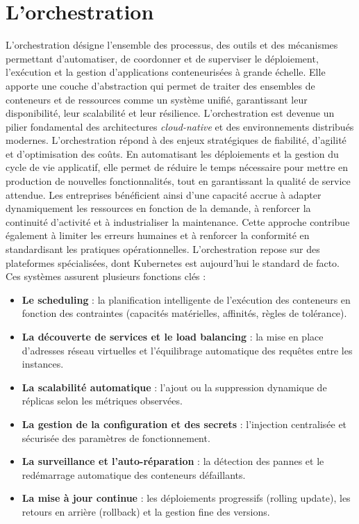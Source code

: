 \section{L’orchestration}

L’orchestration désigne l’ensemble des processus, des outils et des mécanismes permettant d’automatiser, de coordonner et de superviser le déploiement, l’exécution et la gestion d’applications conteneurisées à grande échelle. Elle apporte une couche d’abstraction qui permet de traiter des ensembles de conteneurs et de ressources comme un système unifié, garantissant leur disponibilité, leur scalabilité et leur résilience. L’orchestration est devenue un pilier fondamental des architectures \textit{cloud-native} et des environnements distribués modernes.
L’orchestration répond à des enjeux stratégiques de fiabilité, d’agilité et d’optimisation des coûts. En automatisant les déploiements et la gestion du cycle de vie applicatif, elle permet de réduire le temps nécessaire pour mettre en production de nouvelles fonctionnalités, tout en garantissant la qualité de service attendue. Les entreprises bénéficient ainsi d’une capacité accrue à adapter dynamiquement les ressources en fonction de la demande, à renforcer la continuité d’activité et à industrialiser la maintenance. Cette approche contribue également à limiter les erreurs humaines et à renforcer la conformité en standardisant les pratiques opérationnelles.
L’orchestration repose sur des plateformes spécialisées, dont Kubernetes est aujourd’hui le standard de facto. Ces systèmes assurent plusieurs fonctions clés :
\begin{itemize}
	\item \textbf{Le scheduling} : la planification intelligente de l’exécution des conteneurs en fonction des contraintes (capacités matérielles, affinités, règles de tolérance).
	\item \textbf{La découverte de services et le load balancing} : la mise en place d’adresses réseau virtuelles et l’équilibrage automatique des requêtes entre les instances.
	\item \textbf{La scalabilité automatique} : l’ajout ou la suppression dynamique de réplicas selon les métriques observées.
	\item \textbf{La gestion de la configuration et des secrets} : l’injection centralisée et sécurisée des paramètres de fonctionnement.
	\item \textbf{La surveillance et l’auto-réparation} : la détection des pannes et le redémarrage automatique des conteneurs défaillants.
	\item \textbf{La mise à jour continue} : les déploiements progressifs (rolling update), les retours en arrière (rollback) et la gestion fine des versions.
\end{itemize}

